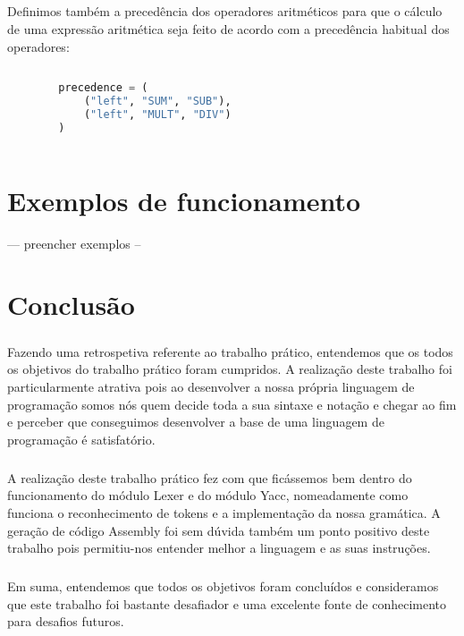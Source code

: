 \documentclass[11pt,a4paper]{report}
\begin{document}
    \paragraph{}
    Definimos também a precedência dos operadores aritméticos para que o cálculo de uma expressão aritmética seja feito de acordo com a precedência habitual dos operadores:
    \begin{lstlisting}[language=Python]
    
        precedence = (
            ("left", "SUM", "SUB"),
            ("left", "MULT", "DIV")
        )
  
    \end{lstlisting}
    
 
    \chapter{Exemplos de funcionamento}
    --- preencher exemplos -- 
    

\chapter{Conclusão}
\paragraph{}
Fazendo uma retrospetiva referente ao trabalho prático, entendemos que os todos os objetivos do trabalho prático foram cumpridos. A realização deste trabalho foi particularmente atrativa pois ao desenvolver a nossa própria linguagem de programação somos nós quem decide toda a sua sintaxe e notação e chegar ao fim e perceber que conseguimos desenvolver a base de uma linguagem de programação é satisfatório.
\paragraph{}
A realização deste trabalho prático fez com que ficássemos bem dentro do funcionamento do módulo Lexer e do módulo Yacc, nomeadamente como funciona o reconhecimento de tokens e a implementação da nossa gramática. A geração de código Assembly foi sem dúvida também um ponto positivo deste trabalho pois permitiu-nos entender melhor a linguagem e as suas instruções. 
\paragraph{}
Em suma, entendemos que todos os objetivos foram concluídos e consideramos que este trabalho foi bastante desafiador e uma excelente fonte de conhecimento para desafios futuros. 
\end{document}
